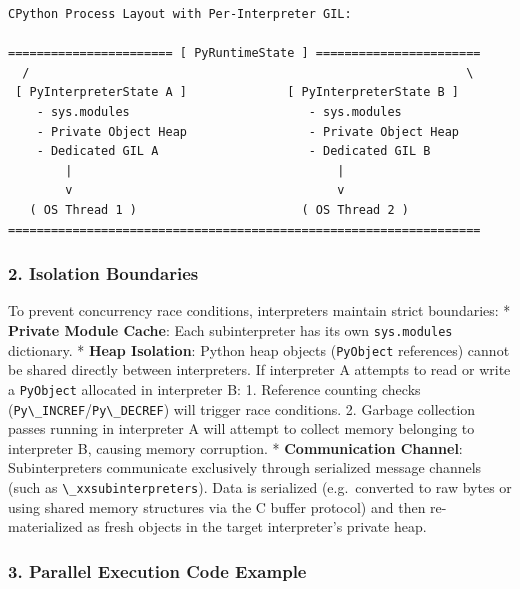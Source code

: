 \begin{lstlisting}
CPython Process Layout with Per-Interpreter GIL:

======================= [ PyRuntimeState ] =======================
  /                                                             \
 [ PyInterpreterState A ]              [ PyInterpreterState B ]
    - sys.modules                         - sys.modules
    - Private Object Heap                 - Private Object Heap
    - Dedicated GIL A                     - Dedicated GIL B
        |                                     |
        v                                     v
   ( OS Thread 1 )                       ( OS Thread 2 )
==================================================================
\end{lstlisting}

\hypertarget{isolation-boundaries}{%
\subsubsection{2. Isolation Boundaries}\label{isolation-boundaries}}

To prevent concurrency race conditions, interpreters maintain strict
boundaries: * \textbf{Private Module Cache}: Each subinterpreter has its
own \passthrough{\lstinline!sys.modules!} dictionary. * \textbf{Heap
Isolation}: Python heap objects (\passthrough{\lstinline!PyObject!}
references) cannot be shared directly between interpreters. If
interpreter A attempts to read or write a
\passthrough{\lstinline!PyObject!} allocated in interpreter B: 1.
Reference counting checks
(\passthrough{\lstinline!Py\_INCREF!}/\passthrough{\lstinline!Py\_DECREF!})
will trigger race conditions. 2. Garbage collection passes running in
interpreter A will attempt to collect memory belonging to interpreter B,
causing memory corruption. * \textbf{Communication Channel}:
Subinterpreters communicate exclusively through serialized message
channels (such as \passthrough{\lstinline!\_xxsubinterpreters!}). Data
is serialized (e.g.~converted to raw bytes or using shared memory
structures via the C buffer protocol) and then re-materialized as fresh
objects in the target interpreter's private heap.

\hypertarget{parallel-execution-code-example}{%
\subsubsection{3. Parallel Execution Code
Example}\label{parallel-execution-code-example}}

